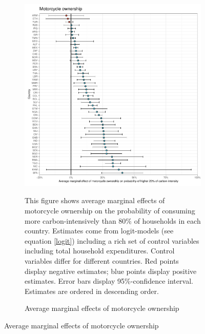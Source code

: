  \begin{figure}[ht!]\ContinuedFloat
   \centering
   \begin{subfigure}[b]{\textwidth}
   \centering
   \includegraphics{1_Figures/Analysis_Logit_Models_Marginal_Effects/Average_Marginal_Effects_affected_upper_80_motorcycle.01_2017B.pdf}
   \caption{Average marginal effects of motorcycle ownership} \label{fig:Logit_ME_motorcycle}
   \begin{subcaption2}
     This figure shows average marginal effects of motorcycle ownership on the probability of consuming more carbon-intensively than 80\% of households in each country. Estimates come from logit-models (see equation \ref{logit}) including a rich set of control variables including total household expenditures. Control variables differ for different countries. Red points display negative estimates; blue points display positive estimates. Error bars display 95\%-confidence interval. Estimates are ordered in descending order.
   \end{subcaption2}
   \end{subfigure}
 \end{figure}
 \clearpage

